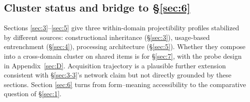 \subsection{Cluster status and bridge to §\ref{sec:6}}

Sections \ref{sec:3}--\ref{sec:5} give three within-domain projectibility profiles stabilized by different sources: constructional inheritance (§\ref{sec:3}), usage-based entrenchment (§\ref{sec:4}), processing architecture (§\ref{sec:5}). Whether they compose into a cross-domain cluster on shared items is for §\ref{sec:7}, with the probe design in Appendix~\ref{sec:D}. Acquisition trajectory is a plausible further extension consistent with §\ref{sec:3-3}'s network claim but not directly grounded by these sections. Section \ref{sec:6} turns from form--meaning accessibility to the comparative question of §\ref{sec:1}.
